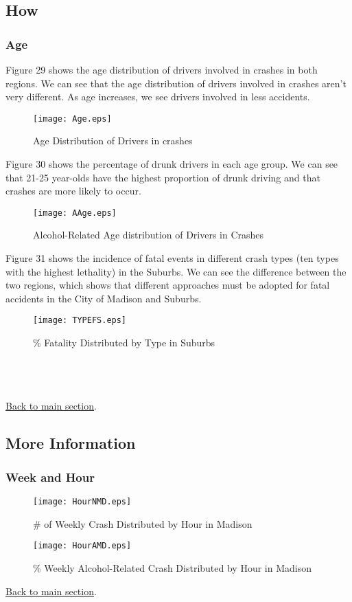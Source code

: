 \documentclass[15pt]{article}
\begin{document}
\newpage
\subsection{How}
\label{sec:How1}
\subsubsection{Age}
Figure 29 shows the age distribution of drivers involved in crashes in both regions. We can see that the age distribution of drivers involved in crashes aren't very different. As age increases, we see drivers involved in less accidents.
\begin{figure}[H]
\flushleft
\texttt{[image: Age.eps]}
\caption{Age Distribution of Drivers in crashes}
\label{11}
\end{figure}

\newpage
Figure 30 shows the percentage of drunk drivers in each age group. We can see that 21-25 year-olds have the highest proportion of drunk driving and that crashes are more likely to occur.
\begin{figure}[H]
\flushleft
\texttt{[image: AAge.eps]}
\caption{Alcohol-Related Age distribution of Drivers in Crashes}
\label{12}
\end{figure}

\newpage
Figure 31 shows the incidence of fatal events in different crash types (ten types with the highest lethality) in the Suburbs. We can see the difference between the two regions, which shows that different approaches must be adopted for fatal accidents in the City of Madison and Suburbs.
\begin{figure}[H]
\flushleft
\texttt{[image: TYPEFS.eps]}
\caption{\% Fatality Distributed by Type in Suburbs}
\label{17}
\end{figure}

~\\
~\\
~\\
\hyperref[sec:How]{\color{blue} \underline {Back to main section}}.

\newpage
\subsection{More Information}
\label{sec:WH1}
\subsubsection{Week and Hour}
\begin{figure}[H]
\flushleft
\texttt{[image: HourNMD.eps]}
\caption{\# of Weekly Crash Distributed by Hour in Madison}
\end{figure}

\begin{figure}[H]
\flushleft
\texttt{[image: HourAMD.eps]}
\caption{\% Weekly Alcohol-Related Crash Distributed by Hour in Madison}
\end{figure}

\hyperref[sec:WH]{\color{blue} \underline {Back to main section}}.
\end{document}
